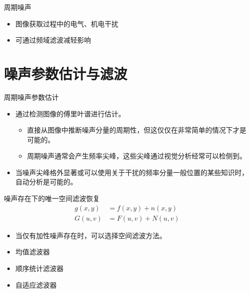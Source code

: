 \documentclass[presentation]{beamer}
\begin{document}
\begin{frame}[label={sec:org568d369}]{周期噪声}
\begin{itemize}
\item 图像获取过程中的电气、机电干扰
\item 可通过频域滤波减轻影响
\end{itemize}
\end{frame}

\section{噪声参数估计与滤波}
\label{sec:org12a2fa5}
\begin{frame}[label={sec:org5d2097f}]{周期噪声参数估计}
\begin{itemize}
\item 通过检测图像的傅里叶谱进行估计。
\begin{itemize}
\item 直接从图像中推断噪声分量的周期性，但这仅仅在非常简单的情况下才是可能的。
\item 周期噪声通常会产生频率尖峰，这些尖峰通过视觉分析经常可以检侧到。
\end{itemize}
\item 当噪声尖峰格外显著或可以使用关于干扰的频率分量一般位置的某些知识时，自动分析是可能的。
\end{itemize}
\end{frame}

\begin{frame}[label={sec:org385af34}]{噪声存在下的唯一空间滤波恢复}
\begin{align*}
g(x,y)&=f(x,y)+n(x,y)\\
G(u,v)&=F(u,v)+N(u,v)
\end{align*}

\begin{itemize}
\item 当仅有加性噪声存在时，可以选择空间滤波方法。
\item 均值滤波器
\item 顺序统计滤波器
\item 自适应滤波器
\end{itemize}
\end{frame}
\end{document}

